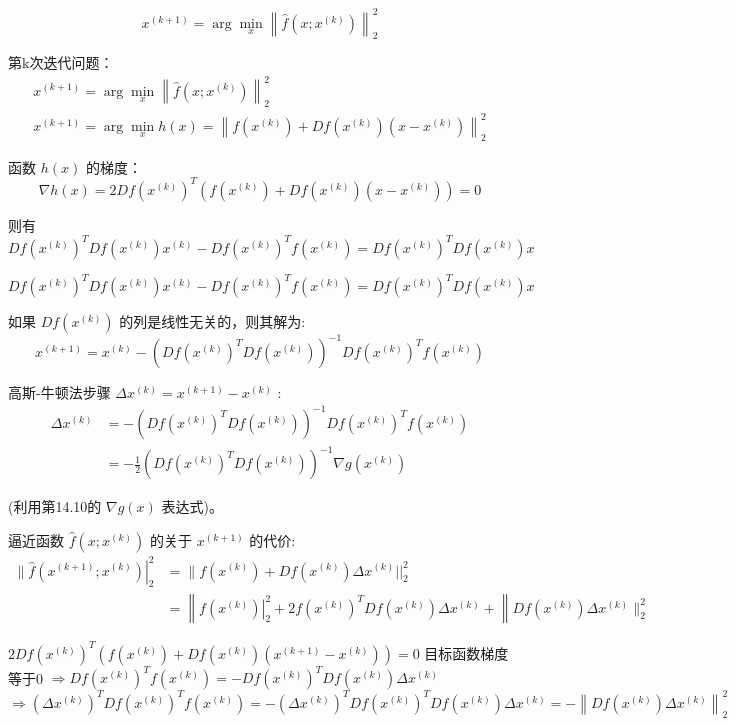 $$
x^{(k+1)}=\arg \min _{x}\left\|\hat{f}\left(x ; x^{(k)}\right)\right\|_{2}^{2}
$$

第k次迭代问题：
$$
\begin{array}{c}
x^{(k+1)}=\arg \min _{x}\left\|\hat{f}\left(x ; x^{(k)}\right)\right\|_{2}^{2} \\
x^{(k+1)}=\arg \min _{x} h(x)=\left\|f\left(x^{(k)}\right)+D f\left(x^{(k)}\right)\left(x-x^{(k)}\right)\right\|_{2}^{2}
\end{array}
$$

函数 $ h(x) $ 的梯度：
$$
\nabla h(x)=2 D f\left(x^{(k)}\right)^{T}\left(f\left(x^{(k)}\right)+D f\left(x^{(k)}\right)\left(x-x^{(k)}\right)\right)=0
$$

则有
$$ D f\left(x^{(k)}\right)^{T} D f\left(x^{(k)}\right) x^{(k)}-D f\left(x^{(k)}\right)^{T} f\left(x^{(k)}\right)=D f\left(x^{(k)}\right)^{T} D f\left(x^{(k)}\right) x $$

$$ D f\left(x^{(k)}\right)^{T} D f\left(x^{(k)}\right) x^{(k)}-D f\left(x^{(k)}\right)^{T} f\left(x^{(k)}\right)=D f\left(x^{(k)}\right)^{T} D f\left(x^{(k)}\right) x $$

如果 $ D f\left(x^{(k)}\right) $ 的列是线性无关的，则其解为:
$$
x^{(k+1)}=x^{(k)}-\left(D f\left(x^{(k)}\right)^{T} D f\left(x^{(k)}\right)\right)^{-1} D f\left(x^{(k)}\right)^{T} f\left(x^{(k)}\right)
$$

高斯-牛顿法步骤 $ \Delta x^{(k)}=x^{(k+1)}-x^{(k)} $ :
$$
\begin{aligned}
\Delta x^{(k)} &=-\left(D f\left(x^{(k)}\right)^{T} D f\left(x^{(k)}\right)\right)^{-1} D f\left(x^{(k)}\right)^{T} f\left(x^{(k)}\right) \\
&=-\frac{1}{2}\left(D f\left(x^{(k)}\right)^{T} D f\left(x^{(k)}\right)\right)^{-1} \nabla g\left(x^{(k)}\right)
\end{aligned}
$$

(利用第14.10的 $ \nabla g(x) $ 表达式)。

逼近函数 $ \hat{f}\left(x ; x^{(k)}\right) $ 的关于 $ x^{(k+1)} $ 的代价:
$$
\begin{aligned}
\|\left.\hat{f}\left(x^{(k+1)} ; x^{(k)}\right)\right|_{2} ^{2} &=\| f\left(x^{(k)}\right)+D f\left(x^{(k)}\right) \Delta x^{(k)}||_{2}^{2} \\
&=\left\|\left.f\left(x^{(k)}\right)\right|_{2} ^{2}+2 f\left(x^{(k)}\right)^{T} D f\left(x^{(k)}\right) \Delta x^{(k)}+\right\| D f\left(x^{(k)}\right) \Delta x^{(k)} \|_{2}^{2}
\end{aligned}
$$

$ 2 D f\left(x^{(k)}\right)^{T}\left(f\left(x^{(k)}\right)+D f\left(x^{(k)}\right)\left(x^{(k+1)}-x^{(k)}\right)\right)=0 $ 目标函数梯度等于0
$ \Rightarrow D f\left(x^{(k)}\right)^{T} f\left(x^{(k)}\right)=-D f\left(x^{(k)}\right)^{T} D f\left(x^{(k)}\right) \Delta x^{(k)} $
$ \Rightarrow\left(\Delta x^{(k)}\right)^{T} D f\left(x^{(k)}\right)^{T} f\left(x^{(k)}\right)=-\left(\Delta x^{(k)}\right)^{T} D f\left(x^{(k)}\right)^{T} D f\left(x^{(k)}\right) \Delta x^{(k)}=-\left\|D f\left(x^{(k)}\right) \Delta x^{(k)}\right\|_{2}^{2} $

